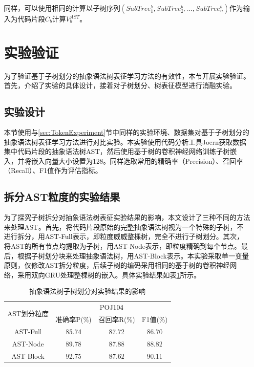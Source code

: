同样，可以使用相同的计算以子树序列$\left(SubTree_{1}^{b},SubTree_{2}^{b},\ldots,SubTree_{n}^{b}\right)$作为输入为代码片段$C_{b}$计算$V_{b}^{AST}$。


\section{实验验证}
\label{sec:ASTExperiment}
为了验证基于子树划分的抽象语法树表征学习方法的有效性，本节开展实验验证。首先，介绍了实验的具体设计，接着对子树划分、树表征模型进行消融实验。

\subsection{实验设计}
\label{subsec:ASTDesign}

本节使用与\ref{sec:TokenExperiment}节中同样的实验环境、数据集对基于子树划分的抽象语法树表征学习方法进行对比实验。本实验使用代码分析工具Joern获取数据集中代码片段的抽象语法树AST，然后使用基于树的卷积神经网络训练子树嵌入，并将嵌入向量大小设置为128。同样选取常用的精确率（Precision）、召回率（Recall）、F1值作为评估指标。

\subsection{拆分AST粒度的实验结果}
\label{subsec:TokenResult1}

为了探究子树拆分对抽象语法树表征实验结果的影响，本文设计了三种不同的方法来处理AST。首先，将代码片段原始的完整抽象语法树视为一个特殊的子树，不进行拆分，用AST-Full表示，即粒度威威整棵树，完全不进行子树划分。其次，将AST的所有节点均提取为子树，用AST-Node表示，即粒度精确到每个节点。最后，根据子树划分块来处理抽象语法树，用AST-Block表示。本实验采取单一变量原则，仅修改AST拆分粒度，后续子树的编码采用相同的基于树的卷积神经网络，采用双向GRU处理整棵树的嵌入。具体实验结果如表\ref{tab:subtree}所示。


\begin{table}[htp] 
  \centering
  \caption{抽象语法树子树划分对实验结果的影响} 
  \label{tab:subtree}
  \begin{tabular*}{0.9\textwidth}{@{\extracolsep{\fill}}cccc}
  \toprule
  \multirow{2}{*}{AST划分粒度} & \multicolumn{3}{c}{POJ104} \\
  \cmidrule{2-4} 
   & 准确率P(\%) & 召回率R(\%) & F1值(\%)  \\  
  \midrule
    AST-Full			&85.74	  &87.72		   &86.70 \\
    AST-Node      &89.78	  &87.88		   &88.82 \\
    AST-Block			&92.75	  &87.62		   &90.11 \\
  \bottomrule
  \end{tabular*}
\end{table}

